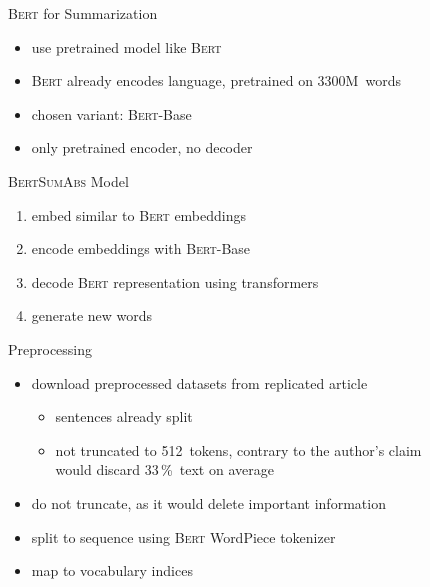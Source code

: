 \documentclass[english,handout]{mlutalk}
\newcommand{\Bert}{\textsc{Bert}\xspace}
\newcommand{\BertBase}{\textsc{Bert}-Base\xspace}
\newcommand{\BertSumAbs}{\textsc{BertSumAbs}\xspace}
\newcommand{\WordPiece}{WordPiece\xspace}
\begin{document}
\begin{frame}{\Bert for Summarization}
    \begin{itemize}
        \item use pretrained model like \Bert~\cite{DevlinCLT2019}
        \item \Bert already encodes language, pretrained on 3300M~words
        \item chosen variant: \BertBase
        \item only pretrained encoder, no decoder
    \end{itemize}
    \begin{block}{\BertSumAbs Model~\cite{LiuL2019}}
        \begin{enumerate}
            \item embed similar to \Bert embeddings
            \item encode embeddings with \BertBase
            \item decode \Bert representation using transformers~\cite{VaswaniSPUJGKP2017}
            \item generate new words
        \end{enumerate}
    \end{block}
\end{frame}

\begin{frame}{Preprocessing}
    \begin{itemize}
        \item download preprocessed datasets from replicated article~\cite{LiuL2019}
        \begin{itemize}
            \item sentences already split
            \item not truncated to 512~tokens, contrary to the author's claim \\ would discard 33\,\%~text on average
        \end{itemize}
        \item do not truncate, as it would delete important information
        \item split to sequence using \Bert \WordPiece tokenizer~\cite{DevlinCLT2019}
        \item map to vocabulary indices
    \end{itemize}
\end{frame}
\end{document}
